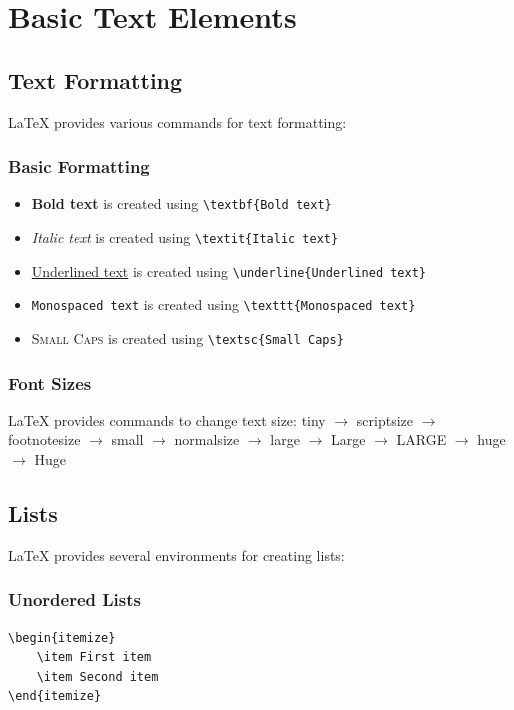 \section{Basic Text Elements}\label{sec:text-elements}

\subsection{Text Formatting}\label{subsec:text-formatting}
LaTeX provides various commands for text formatting:

\subsubsection{Basic Formatting}\label{subsubsec:basic-formatting}
\begin{itemize}
    \item \textbf{Bold text} is created using \verb|\textbf{Bold text}|
    \item \textit{Italic text} is created using \verb|\textit{Italic text}|
    \item \underline{Underlined text} is created using \verb|\underline{Underlined text}|
    \item \texttt{Monospaced text} is created using \verb|\texttt{Monospaced text}|
    \item \textsc{Small Caps} is created using \verb|\textsc{Small Caps}|
\end{itemize}

\subsubsection{Font Sizes}\label{subsubsec:font-sizes}
LaTeX provides commands to change text size:
{\tiny tiny} $\to$
{\scriptsize scriptsize} $\to$
{\footnotesize footnotesize} $\to$
{\small small} $\to$
{\normalsize normalsize} $\to$
{\large large} $\to$
{\Large Large} $\to$
{\LARGE LARGE} $\to$
{\huge huge} $\to$
{\Huge Huge}

\subsection{Lists}\label{subsec:lists}
LaTeX provides several environments for creating lists:

\subsubsection{Unordered Lists}\label{subsubsec:unordered-lists}
\begin{verbatim}
\begin{itemize}
    \item First item
    \item Second item
\end{itemize}
\end{verbatim}

